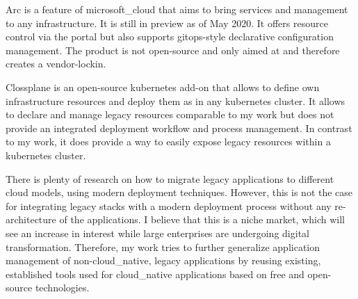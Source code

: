 \documentclass[../main.tex]{subfiles}
\begin{document}
     Arc is a feature of \gls{microsoft_cloud} that aims to bring  services and management to any infrastructure.
    It is still in preview as of May 2020.
    It offers resource control via the  portal but also supports \gls{gitops}-style declarative configuration management.
    The product is not open-source and only aimed at  and therefore creates a vendor-lockin.\cite{azure_arc,azure_arc_announce}

    Clossplane is an open-source \gls{kubernetes} add-on that allows to define own infrastructure resources and deploy them as  in any \gls{kubernetes} cluster.
    It allows to declare and manage legacy resources comparable to my work but does not provide an integrated deployment workflow and process management.
    In contrast to my work, it does provide a way to easily expose legacy resources within a \gls{kubernetes} cluster.\cite{crossplane_overview}

    There is plenty of research on how to migrate legacy applications to different \gls{cloud} models, using modern deployment techniques.
    However, this is not the case for integrating legacy stacks with a modern deployment process without any re-architecture of the applications.
    I believe that this is a niche market, which will see an increase in interest while large enterprises are undergoing digital transformation.
    Therefore, my work tries to further generalize application management of non-\gls{cloud_native}, legacy applications by reusing existing, established tools used for \gls{cloud_native} applications based on free and open-source technologies.
\end{document}
